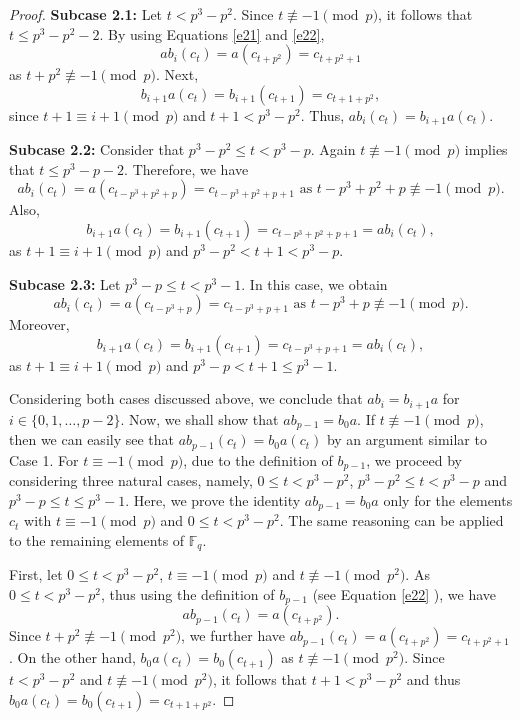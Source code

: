 \documentclass[11pt]{amsart}
\theoremstyle{plain}
\numberwithin{equation}{section}
\def\F{{\mathbb F}}
\begin{document}
\begin{proof}
\textbf{Subcase 2.1:} Let $t < p^{3}-p^2$. Since $t \not \equiv -1  \pmod  p$, it follows that $t \leq p^{3}-p^2-2$. By using Equations \eqref{e21} and \eqref{e22},
\[
ab_i(c_t)=a(c_{t+p^2})=c_{t+p^2+1} 
\]
as  $t+p^2 \not \equiv -1 \pmod  p.$ Next,
\[
b_{i+1}a(c_t)=b_{i+1}(c_{t+1})=c_{t+1+p^2},
\]
since $t+1 \equiv i+1  \pmod  p$ and  $t+1<p^{3}-p^2$. Thus, $ab_i(c_t)=b_{i+1}a(c_t)$.

\textbf{Subcase 2.2:} Consider that $p^{3}-p^2 \leq t < p^{3}-p$. Again $t \not \equiv -1  \pmod  p$ implies that $t \leq p^{3}-p-2$. Therefore, we have
\[
ab_i(c_t)=a(c_{t-p^3+p^2+p})=c_{t-p^3+p^2+p+1} \text{ as } t-p^3+p^2+p \not \equiv -1 \pmod  p.
\]
Also,
\[
b_{i+1}a(c_t)=b_{i+1}(c_{t+1})=c_{t-p^3+p^2+p+1}=ab_i(c_t),
\]
as $t+1 \equiv i+1  \pmod  p$ and  $p^{3}-p^2 < t+1<p^{3}-p$.

\textbf{Subcase 2.3:} Let $p^{3}-p \leq t < p^{3}-1$.  In this case, we obtain
\[
ab_i(c_t)=a(c_{t-p^3+p})=c_{t-p^3+p+1} \text{ as } t-p^3+p \not \equiv -1 \pmod  p.
\]
Moreover,
\[
b_{i+1}a(c_t)=b_{i+1}(c_{t+1})=c_{t-p^3+p+1}=ab_i(c_t),
\]
as $t+1 \equiv i+1 \pmod  p$ and  $p^{3}-p < t+1 \leq p^{3}-1$.

Considering both cases discussed above, we conclude that $ab_i=b_{i+1}a$ for $i \in \{0,1,\ldots,p-2\}$. Now, we shall show that $ab_{p-1}=b_0a$. If $t \not \equiv -1  \pmod  p$, then we can easily see that $ab_{p-1}(c_t)=b_0a(c_t)$ by an argument similar to Case 1. For $t  \equiv -1 \pmod  p$, due to the definition of $b_{p-1}$, we proceed by considering three natural cases, namely, $0 \leq t < p^{3}-p^2$, $p^3-p^2 \leq t < p^{3}-p$ and $p^{3}-p \leq t \leq p^{3}-1$. Here, we prove the identity $ab_{p-1}=b_0a$ only for the elements
$c_t$ with $t  \equiv -1 \pmod  p$ and $0 \leq t < p^{3}-p^2$. The same reasoning can be applied to the remaining elements of $\F_q.$


First, let $0 \leq t < p^{3}-p^2$, $t \equiv -1 \pmod  p$ and $t  \not \equiv -1 \pmod {p^2}$.  As $0 \leq t < p^{3}-p^2$, thus using the definition of $b_{p-1}$ (see Equation \eqref{e22} ), we have
\[
ab_{p-1}(c_t)=a(c_{t+p^2}).
\]
Since $t+p^2 \not \equiv -1  \pmod {p^2}$, we further have $ab_{p-1}(c_t)=a(c_{t+p^2})=c_{t+p^2+1}$.
On the other hand, $b_0a(c_t)=b_0(c_{t+1})$ as $t \not \equiv -1  \pmod {p^2}$.  Since  $t < p^{3}-p^2$ and $t \not \equiv -1  \pmod {p^2}$, it follows that $t+1 < p^{3}-p^2$ and thus $b_0a(c_t)=b_0(c_{t+1})=c_{t+1+p^2}$.


\end{proof}
\end{document}
